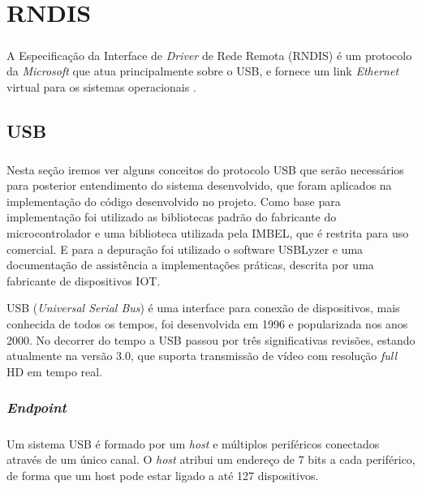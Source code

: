 \chapter{RNDIS}
\noindent

\paragraph{} A Especificação da Interface de \textit{Driver} de Rede Remota (RNDIS) é um protocolo da \textit{Microsoft} que atua principalmente sobre o USB, e fornece um link \textit{Ethernet} virtual para os sistemas operacionais \citep{RNDIS}.

\section{USB}

\paragraph{} 
Nesta seção iremos ver alguns conceitos do protocolo USB que serão necessários para posterior entendimento do sistema desenvolvido, que foram aplicados na implementação do código desenvolvido no projeto. Como base para implementação foi utilizado as bibliotecas padrão do fabricante do microcontrolador e uma biblioteca utilizada pela IMBEL, que é restrita para uso comercial. E para a depuração foi utilizado o software USBLyzer e uma documentação de assistência a implementações práticas, descrita por uma fabricante de dispositivos IOT. 

USB (\textit{Universal Serial Bus}) é uma interface para conexão de dispositivos, mais conhecida de todos os tempos, foi desenvolvida em 1996 e popularizada nos anos 2000. No decorrer do tempo a USB passou por três significativas revisões, estando atualmente na versão 3.0, que suporta transmissão de vídeo com resolução \textit{full} HD em tempo real.

\subsection{\textit{Endpoint}}

\paragraph{}Um sistema USB é formado por um \textit{host} e múltiplos periféricos conectados através de um único canal. O \textit{host} atribui um endereço de 7 bits a cada periférico, de forma que um host pode estar ligado a até 127 dispositivos.

